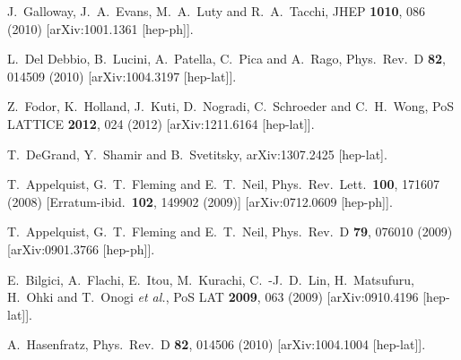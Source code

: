 \begin{thebibliography}{99}
  J.~Galloway, J.~A.~Evans, M.~A.~Luty and R.~A.~Tacchi,
  JHEP {\bf 1010}, 086 (2010)
  [arXiv:1001.1361 [hep-ph]].
  
  L.~Del Debbio, B.~Lucini, A.~Patella, C.~Pica and A.~Rago,
  Phys.\ Rev.\ D {\bf 82}, 014509 (2010)
  [arXiv:1004.3197 [hep-lat]].
  
  Z.~Fodor, K.~Holland, J.~Kuti, D.~Nogradi, C.~Schroeder and C.~H.~Wong,
  PoS LATTICE {\bf 2012}, 024 (2012)
  [arXiv:1211.6164 [hep-lat]].

  T.~DeGrand, Y.~Shamir and B.~Svetitsky,
  arXiv:1307.2425 [hep-lat].
  
  T.~Appelquist, G.~T.~Fleming and E.~T.~Neil,
  Phys.\ Rev.\ Lett.\  {\bf 100}, 171607 (2008)
  [Erratum-ibid.\  {\bf 102}, 149902 (2009)]
  [arXiv:0712.0609 [hep-ph]].
  
  T.~Appelquist, G.~T.~Fleming and E.~T.~Neil,
  Phys.\ Rev.\ D {\bf 79}, 076010 (2009)
  [arXiv:0901.3766 [hep-ph]].

  E.~Bilgici, A.~Flachi, E.~Itou, M.~Kurachi, C.~-J.~D.~Lin, H.~Matsufuru, H.~Ohki and T.~Onogi {\it et al.},
  PoS LAT {\bf 2009}, 063 (2009)
  [arXiv:0910.4196 [hep-lat]].
  
  A.~Hasenfratz,
  Phys.\ Rev.\ D {\bf 82}, 014506 (2010)
  [arXiv:1004.1004 [hep-lat]].
  

\end{thebibliography}
